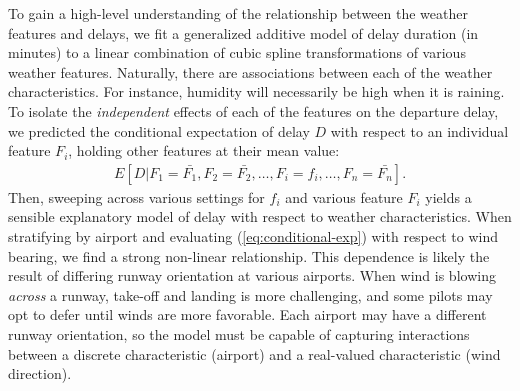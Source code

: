 \documentclass{article}
\begin{document}
To gain a high-level understanding of the relationship between the weather features and delays, we fit a generalized additive model \citep{hastie1990generalized} of delay duration (in minutes) to a linear combination of cubic spline transformations of various weather features. Naturally, there are associations between each of the weather characteristics. For instance, humidity will necessarily be high when it is raining. To isolate the \emph{independent} effects of each of the features on the departure delay, we predicted the conditional expectation of delay $D$ with respect to an individual feature $F_i$, holding other features at their mean value:
\begin{align}
    \label{eq:conditional-exp}
    E[D|F_1=\bar{F_1}, F_2=\bar{F_2}, \ldots, F_i = f_i, \ldots, F_n = \bar{F_n}].
\end{align}
Then, sweeping across various settings for $f_i$ and various feature $F_i$ yields a sensible explanatory model of delay with respect to weather characteristics. When stratifying by airport and evaluating (\ref{eq:conditional-exp}) with respect to wind bearing, we find a strong non-linear relationship. This dependence is likely the result of differing runway orientation at various airports. When wind is blowing \emph{across} a runway, take-off and landing is more challenging, and some pilots may opt to defer until winds are more favorable. Each airport may have a different runway orientation, so the model must be capable of capturing interactions between a discrete characteristic (airport) and a real-valued characteristic (wind direction).
\end{document}
